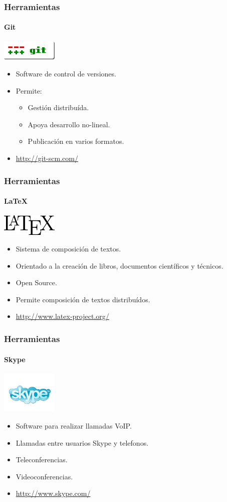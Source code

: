 \begin{frame}
\frametitle{Herramientas}
\framesubtitle{Git}
\begin{center}
	\includegraphics[width=0.2\textwidth]{img/git}
\end{center}
\begin{itemize}
    \item Software de control de versiones.
	\item Permite:
	\begin{itemize}
		\item Gestión distribuída.
		\item Apoya desarrollo no-lineal.
		\item Publicación en varios formatos.
	\end{itemize}
	\item \url{http://git-scm.com/}
\end{itemize}
\end{frame}

\begin{frame}
\frametitle{Herramientas}
\framesubtitle{LaTeX}
\begin{center}
	\includegraphics[width=0.2\textwidth]{img/latex}
\end{center}
\begin{itemize}
	\item Sistema de composición de textos.
	\item Orientado a la creación de libros, documentos científicos y técnicos.
	\item Open Source.
	\item Permite composición de textos distribuídos.
    \item \url{http://www.latex-project.org/}
\end{itemize}
\end{frame}

\begin{frame}
\frametitle{Herramientas}
\framesubtitle{Skype}
\begin{center}
	\includegraphics[width=0.2\textwidth]{img/skype}
\end{center}
\begin{itemize}
	\item Software para realizar llamadas VoIP.
	\item Llamadas entre usuarios Skype y telefonos.
	\item Teleconferencias.
	\item Videoconferencias.
    \item \url{http://www.skype.com/}
\end{itemize}
\end{frame}
